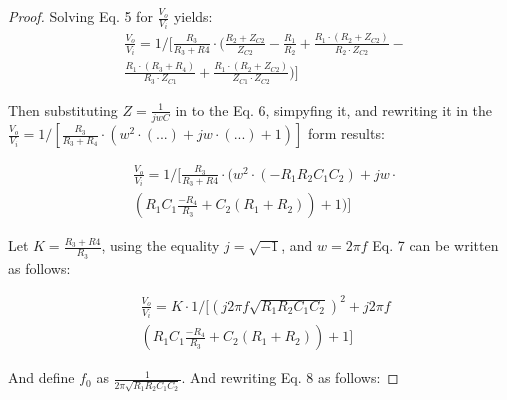 \documentclass{article}
\begin{document}
\begin{proof}
Solving Eq. 5 for \begin{math} \frac{V_o}{V_i} \end{math} yields:
\begin{equation}
\begin{aligned}
& \frac{V_o}{V_i} = 1 / [ \frac{R_3}{R_3 + R4} \cdot  ( \frac{R_2 + Z_{C2}}{Z_{C2}} - \frac{R_1}{R_2} + \frac{R_1 \cdot (R_2 + Z_{C2})}{R_2 \cdot Z_{C2}} - \\
& \frac{R_1 \cdot (R_3 + R_4)}{R_3 \cdot Z_{C1}} + \frac{R_1 \cdot (R_2 + Z_ {C2})}{Z_ {C1} \cdot Z_ {C2}} ) ]
\end {aligned}
\end{equation}

Then substituting \begin{math} Z = \frac{1}{jwC} \end{math} in to the Eq. 6, simpyfing it, and rewriting it in the 
\begin{math} 
\frac{V_o}{V_i} = 1 / [ \frac{R_3}{R_3 + R_4} \cdot ( w^2 \cdot (...) + jw \cdot (...) +1 ) ]  
\end{math} 
form results:

\begin{equation}
\begin{aligned}
&\frac{V_o}{V_i} = 1 / [ \frac{R_3}{R_3 + R4} \cdot ( w^2 \cdot (-R_1 R_2 C_1 C_2) + jw \cdot \\ 
&(R_1 C_1 \frac{-R_4}{R_3} + C_2 (R_1 + R_2) ) +1 ) ]
\end {aligned}
\end{equation}

Let \begin{math} K = \frac{R_3 + R4}{R_3} \end{math}, using the equality \begin{math} j = \sqrt{-1} \end{math}, and \begin{math} w = 2 \pi f \end{math} Eq. 7 can be written as follows:

\begin{equation}
\begin{aligned}
& \frac{V_o}{V_i} = K \cdot 1 / [ ( j 2 \pi f \sqrt{R_1 R_2 C_1 C_2} )^2 + j  2 \pi f \\
& (R_1 C_1 \frac{-R_4}{R_3} + C_2 (R_1 + R_2) ) + 1 ]
\end {aligned}
\end{equation}

And define \begin{math} f_0 \end{math} as \begin{math} \frac{1}{2 \pi \sqrt{R_1 R_2 C_1 C_2}} \end{math}. And rewriting Eq. 8 as follows:


\end{proof}
\end{document}
